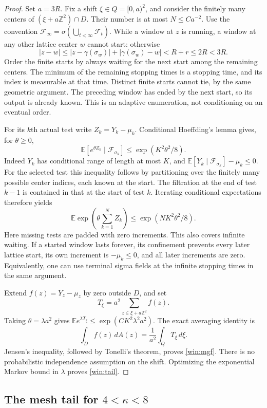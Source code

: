 \documentclass[11pt]{article}
\theoremstyle{definition}
\theoremstyle{remark}
\numberwithin{equation}{section}
\begin{document}
\begin{proof}
Set $a=3R$.  Fix a shift $\xi\in Q=[0,a)^2$, and consider the finitely
many centers of $(\xi+a\mathbb Z^2)\cap D$.  Their number is at most
$N\le C a^{-2}$.  Use the convention
$\mathcal F_\infty=\sigma(\bigcup_{t<\infty}\mathcal F_t)$.
While a window at $z$ is running, a window at any
other lattice center $w$ cannot start: otherwise
\[
 |z-w|\le |z-\gamma(\sigma_w)|+|\gamma(\sigma_w)-w|
          <R+r\le2R<3R.
\]
Order the finite starts by always waiting for the next start among the
remaining centers.  The minimum of the remaining stopping times is a
stopping time, and its index is measurable at that time.  Distinct finite
starts cannot tie, by the same geometric argument.  The preceding
window has ended by the next start, so its output is already known.
This is an adaptive enumeration, not conditioning on an eventual order.

For its $k$th actual test write $Z_k=Y_k-\mu_k$.  Conditional Hoeffding's
lemma gives, for $\theta\ge0$,
\[
 \mathbb E[e^{\theta Z_k}\mid\mathcal F_{\sigma_k}]
 \le \exp(K^2\theta^2/8).
\]
Indeed $Y_k$ has conditional range of length at most $K$, and
$\mathbb E[Y_k\mid\mathcal F_{\sigma_k}]-\mu_k\le0$.
For the selected test this inequality follows by partitioning over
the finitely many possible center indices, each known at the start.
The filtration at the end of test $k-1$ is contained in that at the
start of test $k$.  Iterating conditional expectations therefore yields
\[
 \mathbb E\exp\left(\theta\sum_{k=1}^{N}Z_k\right)
       \le \exp(NK^2\theta^2/8).
\]
Here missing tests are padded with zero increments.  This also covers
infinite waiting.  If a started window lasts forever, its confinement
prevents every later lattice start, its own increment is $-\mu_k\le0$,
and all later increments are zero.  Equivalently, one can use terminal
sigma fields at the infinite stopping times in the same argument.

Extend $f(z)=Y_z-\mu_z$ by zero outside $D$, and set
\[
 T_\xi=a^2\sum_{z\in\xi+a\mathbb Z^2}f(z).
\]
Taking $\theta=\lambda a^2$ gives
$\mathbb E e^{\lambda T_\xi}\le\exp(CK^2\lambda^2a^2)$.
The exact averaging identity is
\[
 \int_D f(z)\,dA(z)=\frac1{a^2}\int_Q T_\xi\,d\xi.
\]
Jensen's inequality, followed by Tonelli's theorem, proves
\eqref{win:mgf}.  There is no probabilistic independence assumption
on the shift.  Optimizing the exponential Markov bound in $\lambda$
proves \eqref{win:tail}.
\end{proof}

\subsection{The mesh tail for
\texorpdfstring{$4<\kappa<8$}{kappa between four and eight}}
\end{document}
